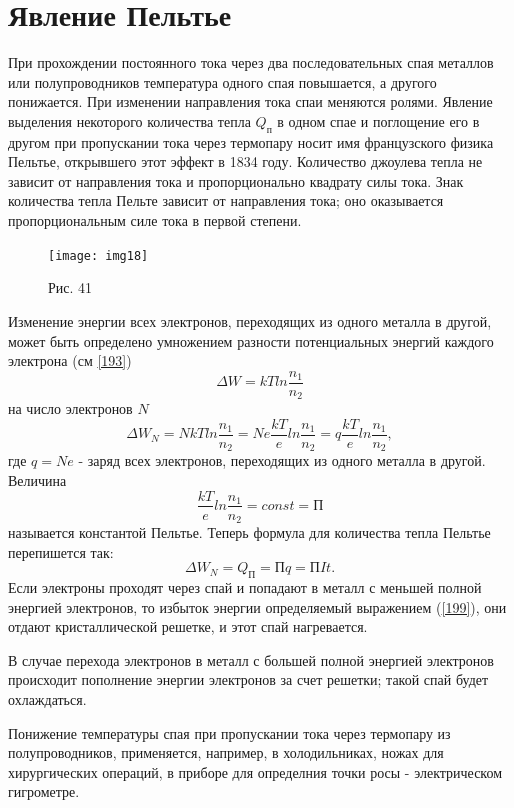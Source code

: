 \documentclass[a4paper,10pt]{book}
\begin{document}
\section{Явление Пельтье}
При прохождении постоянного тока через два последовательных спая металлов или полупроводников температура одного спая повышается, а другого понижается. При изменении направления тока спаи меняются ролями. Явление выделения некоторого количества тепла $Q_\text{п}$ в одном спае и поглощение его в другом при пропускании тока через термопару носит имя французского физика Пельтье, открывшего этот эффект в 1834 году. Количество джоулева тепла не зависит от направления тока и пропорционально квадрату силы тока. Знак количества тепла Пельте зависит от направления тока; оно оказывается пропорциональным силе тока в первой степени.

\begin{figure}[h]
\texttt{[image: img18]}
\caption{Рис. 41}
\label{img18}
\end{figure}
Изменение энергии всех электронов, переходящих из одного металла в другой, может быть определено умножением разности потенциальных энергий каждого электрона (см \ref{193})
\begin{equation*}
 \Delta W = kTln\frac{n_1}{n_2}
\end{equation*}
на число электронов $N$
\begin{equation}\label{199}
 \Delta W_N = NkTln\frac{n_1}{n_2} = Ne\frac{kT}{e}ln\frac{n_1}{n_2} = q\frac{kT}{e}ln\frac{n_1}{n_2},
\end{equation}
где $q = Ne$ - заряд всех электронов, переходящих из одного металла в другой.
Величина
\begin{equation}\label{1910}
 \frac{kT}{e}ln\frac{n_1}{n_2} = const = \text{П}
\end{equation}
называется константой Пельтье. Теперь формула для количества тепла Пельтье перепишется так:
\begin{equation}\label{1911}
 \Delta W_N = Q_\text{П} = \text{П}q = \text{П}It.
\end{equation}
Если электроны проходят через спай и попадают в металл с меньшей полной энергией электронов, то избыток энергии определяемый выражением (\ref{199}), они отдают кристаллической решетке, и этот спай нагревается.

В случае перехода электронов в металл с большей полной энергией электронов происходит пополнение энергии электронов за счет решетки; такой спай будет охлаждаться.

Понижение температуры спая при пропускании тока через термопару из полупроводников, применяется, например, в холодильниках, ножах для хирургических операций, в приборе для определния точки росы - электрическом гигрометре.
\end{document}
